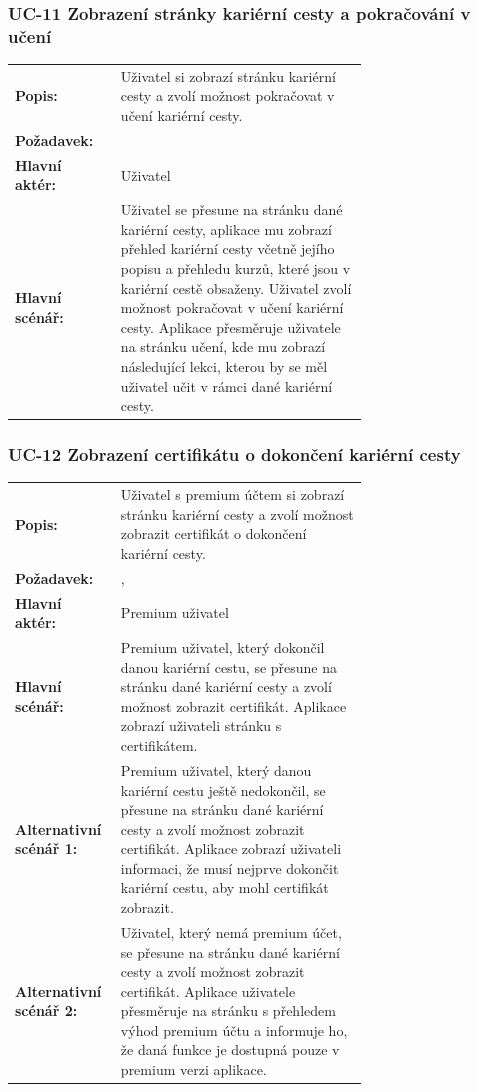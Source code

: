\subsubsection{UC-11 Zobrazení stránky kariérní cesty a pokračování v učení}

\begin{tabular}{lp{0.7\linewidth}}
  \textbf{Popis:} & Uživatel si zobrazí stránku kariérní cesty a zvolí možnost pokračovat v učení kariérní cesty. \\
  \textbf{Požadavek:} & \nameref{sec:fp-learning-paths} \\
  \textbf{Hlavní aktér:} & Uživatel \\
  \textbf{Hlavní scénář:} & Uživatel se přesune na stránku dané kariérní cesty, aplikace mu zobrazí přehled kariérní cesty včetně jejího popisu a přehledu kurzů, které jsou v kariérní cestě obsaženy. Uživatel zvolí možnost pokračovat v učení kariérní cesty. Aplikace přesměruje uživatele na stránku učení, kde mu zobrazí následující lekci, kterou by se měl uživatel učit v rámci dané kariérní cesty. \\
\end{tabular}

\subsubsection{UC-12 Zobrazení certifikátu o dokončení kariérní cesty}

\begin{tabular}{lp{0.7\linewidth}}
  \textbf{Popis:} & Uživatel s premium účtem si zobrazí stránku kariérní cesty a zvolí možnost zobrazit certifikát o dokončení kariérní cesty. \\
  \textbf{Požadavek:} & \nameref{sec:fp-learning-paths}, \nameref{sec:fp-subscription-system} \\
  \textbf{Hlavní aktér:} & Premium uživatel \\
  \textbf{Hlavní scénář:} & Premium uživatel, který dokončil danou kariérní cestu, se přesune na stránku dané kariérní cesty a zvolí možnost zobrazit certifikát. Aplikace zobrazí uživateli stránku s certifikátem. \\
  \textbf{Alternativní scénář 1:} & Premium uživatel, který danou kariérní cestu ještě nedokončil, se přesune na stránku dané kariérní cesty a zvolí možnost zobrazit certifikát. Aplikace zobrazí uživateli informaci, že musí nejprve dokončit kariérní cestu, aby mohl certifikát zobrazit. \\
  \textbf{Alternativní scénář 2:} & Uživatel, který nemá premium účet, se přesune na stránku dané kariérní cesty a zvolí možnost zobrazit certifikát. Aplikace uživatele přesměruje na stránku s přehledem výhod premium účtu a informuje ho, že daná funkce je dostupná pouze v premium verzi aplikace. \\
\end{tabular}

